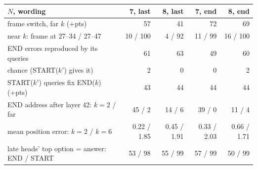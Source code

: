 \begin{tabular}{lrrrr}
\toprule
$N$, wording & 7, last & 8, last & 7, end & 8, end \\
\midrule
frame switch, far $k$ (+pts) & 57 & 41 & 72 & 69 \\
near $k$: frame at 27--34 / 27--47 & 10 / 100 & 4 / 92 & 11 / 99 & 16 / 100 \\
END errors reproduced by its queries & 61 & 63 & 49 & 60 \\
\quad chance (START($k'$) gives it) & 2 & 0 & 0 & 2 \\
START($k'$) queries fix END($k$) (+pts) & 43 & 44 & 44 & 44 \\
END address after layer 42: $k=2$ / far & 45 / 2 & 14 / 6 & 39 / 0 & 11 / 4 \\
mean position error: $k=2$ / $k=6$ & 0.22 / 1.85 & 0.45 / 1.91 & 0.33 / 2.03 & 0.66 / 1.71 \\
late heads' top option = answer: END / START & 53 / 98 & 55 / 99 & 57 / 99 & 50 / 99 \\
\bottomrule
\end{tabular}
